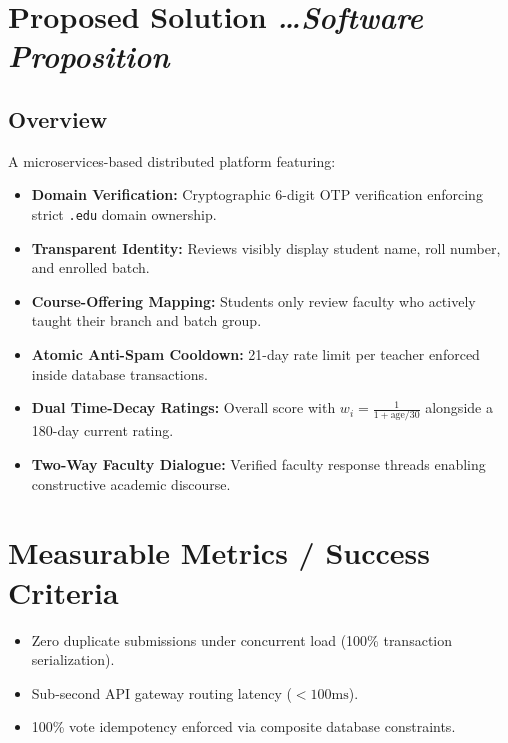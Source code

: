 \documentclass[11pt,a4paper]{article}
\newcommand{\BvrHint}[1]{%
  {\normalfont\normalsize\itshape\hfill #1}}
\begin{document}
\section{Proposed Solution %
\BvrHint{\ldots Software Proposition}}
\subsection{Overview}
A microservices-based distributed platform featuring:
\begin{itemize}[leftmargin=0.7cm]
    \item \textbf{Domain Verification:} Cryptographic 6-digit OTP verification enforcing strict \texttt{\@thapar.edu} domain ownership.
    \item \textbf{Transparent Identity:} Reviews visibly display student name, roll number, and enrolled batch.
    \item \textbf{Course-Offering Mapping:} Students only review faculty who actively taught their branch and batch group.
    \item \textbf{Atomic Anti-Spam Cooldown:} 21-day rate limit per teacher enforced inside database transactions.
    \item \textbf{Dual Time-Decay Ratings:} Overall score with $w_i = \frac{1}{1 + \text{age}/30}$ alongside a 180-day current rating.
    \item \textbf{Two-Way Faculty Dialogue:} Verified faculty response threads enabling constructive academic discourse.
\end{itemize}

\section{Measurable Metrics / Success Criteria}
\begin{itemize}[leftmargin=0.7cm]
    \item Zero duplicate submissions under concurrent load (100\% transaction serialization).
    \item Sub-second API gateway routing latency ($< 100\text{ms}$).
    \item 100\% vote idempotency enforced via composite database constraints.
\end{itemize}
\end{document}

